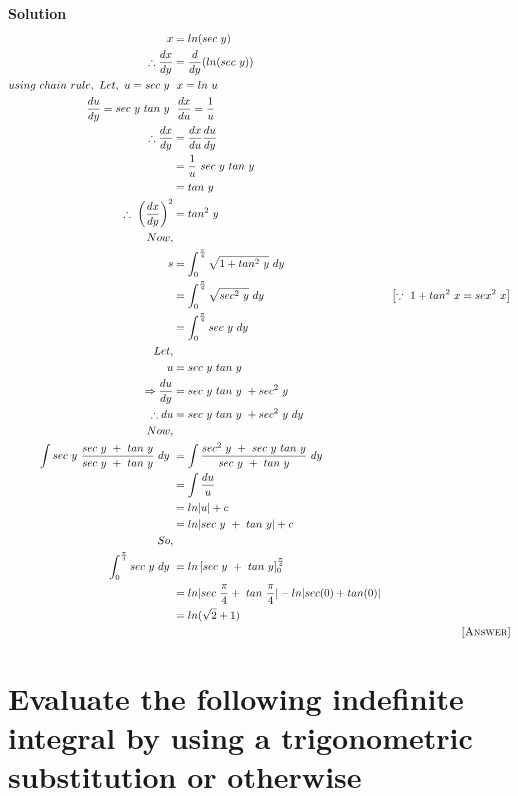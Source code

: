\documentclass[12pt]{article}
\begin{document}
\textbf{Solution}
\begin{align*}
    x&=ln(sec\ y)\\
    \therefore\frac{dx}{dy}&=\frac{d}{dy}(ln(sec\ y))\\
    using\ chain\ rule,\ Let,\ u=sec\ y\ &\  x=ln\ u\\
    \frac{du}{dy}=sec\ y\ tan\ y\ &\ \frac{dx}{du}=\frac{1}{u}\\
    \therefore \frac{dx}{dy}&=\frac{dx}{du}\frac{du}{dy}\\
    &=\frac{1}{u}\ sec\ y\ tan\ y\\
    &=tan\ y\\
    \therefore\ \left(\frac{dx}{dy}\right)^2&=tan^2\ y\\
    Now,\\ s&=\int_{0}^{\frac{\pi}{4}}\sqrt{1+tan^2\ y}\ dy\\
    &=\int_{0}^{\frac{\pi}{4}}\sqrt{sec^2\ y}\ dy & \left[\because\ 1+tan^2\ x = sex^2\ x\right] \\
    &=\int_{0}^{\frac{\pi}{4}}sec\ y\ dy\\
    Let,\\ u&=sec\ y\ tan\ y\\
    \Rightarrow \frac{du}{dy}&=sec\ y\ tan\ y\ +sec^2\ y\\
    \therefore du&= sec\ y\ tan\ y\ +sec^2\ y\ dy\\
    Now,\\ \int{sec\ y}\ \frac{sec\ y\ +\ tan\ y}{sec\ y\ +\ tan\ y}\ dy\ &=\int{\frac{sec^2\ y\ +\ sec\ y\ tan\ y }{sec\ y\ +\ tan\ y}}\ dy\\
    &=\int\frac{du}{u}\\
    &=ln|u|+c\\
    &=ln|sec\ y\ +\ tan\ y|+c\\
    So,\\ \int_{0}^{\frac{\pi}{4}}sec\ y\ dy\
    &=ln\left[sec\ y\ +\ tan\ y\right]_{0}^{\frac{\pi}{4}}\\
    &=ln|sec\ \frac{\pi}{4}+\ tan\ \frac{\pi}{4}| - ln|sec(0) + tan(0)|\\
    &=ln(\sqrt{2}+1)\\
    & & \textsc{[Answer]}
\end{align*}

\section{Evaluate the following indefinite integral by using a trigonometric substitution or otherwise}
\end{document}
